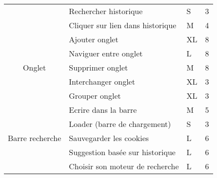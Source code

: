 \documentclass[10pt,a4paper]{article}
\begin{document}
\begin{table}[H]
\begin{tabular}{|c|l|l|l|}
                                        & Rechercher historique                        & S                                            & 3                                           \\ \cline{2-4} 
                                        & Cliquer sur lien dans historique             & M                                            & 4                                           \\ \hline
\multirow{5}{*}{Onglet}                 & Ajouter onglet                               & XL                                           & 8                                           \\ \cline{2-4} 
                                        & Naviguer entre onglet                        & L                                            & 8                                           \\ \cline{2-4} 
                                        & Supprimer onglet                             & M                                            & 8                                           \\ \cline{2-4} 
                                        & Interchanger onglet                          & XL                                           & 3                                           \\ \cline{2-4} 
                                        & Grouper onglet                               & XL                                           & 3                                           \\ \hline
\multirow{5}{*}{Barre recherche}        & Ecrire dans la barre                         & M                                            & 5                                           \\ \cline{2-4} 
                                        & Loader (barre de chargement)                 & S                                            & 3                                           \\ \cline{2-4} 
                                        & Sauvegarder les cookies                      & L                                            & 6                                           \\ \cline{2-4} 
                                        & Suggestion basée sur historique              & L                                            & 6                                           \\ \cline{2-4} 
                                        & Choisir son moteur de recherche              & L                                            & 6                                           \\ \hline

\end{tabular}
\end{table}
\end{document}
